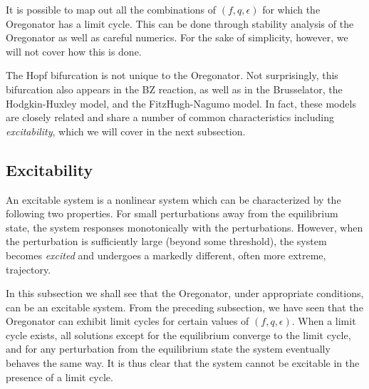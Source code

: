 \documentclass[twocolumn,amsmath,amssymb,aps]{revtex4}
\begin{document}
It is possible to map out all the combinations of $(f,q,\epsilon)$ for which the Oregonator has a limit cycle. This can be done through stability analysis of the Oregonator as well as careful numerics. For the sake of simplicity, however, we will not cover how this is done.


The Hopf bifurcation is not unique to the Oregonator. Not surprisingly, this bifurcation also appears in the BZ reaction, as well as in the Brusselator, the Hodgkin-Huxley model, and the FitzHugh-Nagumo model. In fact, these models are closely related and share a number of common characteristics including \textit{excitability}, which we will cover in the next subsection.


\subsection{Excitability}
An excitable system is a nonlinear system which can be characterized by the following two properties. For small perturbations away from the equilibrium state, the system responses monotonically with the perturbations.  However, when the perturbation is sufficiently large (beyond some threshold), the system becomes \textit{excited} and undergoes a markedly different, often more extreme, trajectory.  

In this subsection we shall see that the Oregonator, under appropriate conditions, can be an excitable system. From the preceding subsection, we have seen that the Oregonator can exhibit limit cycles for certain values of $(f,q,\epsilon)$. When a limit cycle exists, all solutions except for the equilibrium converge to the limit cycle, and for any perturbation from the equilibrium state the system eventually behaves the same way. It is thus clear that the system cannot be excitable in the presence of a limit cycle. 
\end{document}
